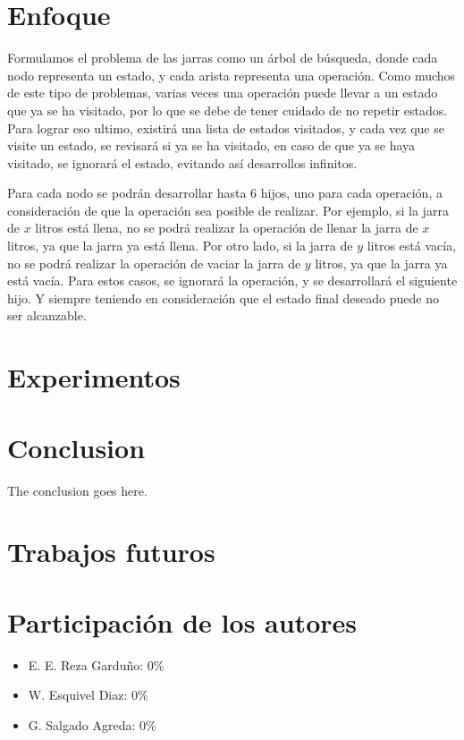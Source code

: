 \documentclass[journal]{IEEEtran}
\begin{document}
\section{Enfoque}
Formulamos el problema de las jarras como un árbol de búsqueda, donde cada nodo representa un estado, y cada arista representa una operación. Como muchos de este tipo de problemas, varias veces una operación puede llevar a un estado que ya se ha visitado, por lo que se debe de tener cuidado de no repetir estados.
Para lograr eso ultimo, existirá una lista de estados visitados, y cada vez que se visite un estado, se revisará si ya se ha visitado, en caso de que ya se haya visitado, se ignorará el estado, evitando así desarrollos infinitos.

Para cada nodo se podrán desarrollar hasta 6 hijos, uno para cada operación, a consideración de que la operación sea posible de realizar. Por ejemplo, si la jarra de $x$ litros está llena, no se podrá realizar la operación de llenar la jarra de $x$ litros, ya que la jarra ya está llena. Por otro lado, si la jarra de $y$ litros está vacía, no se podrá realizar la operación de vaciar la jarra de $y$ litros, ya que la jarra ya está vacía. Para estos casos, se ignorará la operación, y se desarrollará el siguiente hijo.
Y siempre teniendo en consideración que el estado final deseado puede no ser alcanzable.



\section{Experimentos}

\section{Conclusion}
The conclusion goes here.

\section{Trabajos futuros}

\section{Participación de los autores}
\begin{itemize}
  \item E. E. Reza Garduño: 0\%
  \item W. Esquivel Diaz: 0\%
  \item G. Salgado Agreda: 0\%
\end{itemize}
\end{document}
